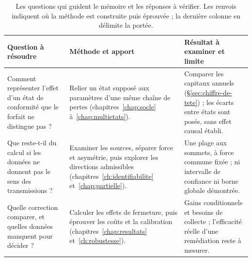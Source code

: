 \begin{table}[H]\centering\small
\begingroup
{}
\renewcommand{\arraystretch}{1.3}
\begin{tabularx}{\textwidth}{@{}*{3}{>{\raggedright\arraybackslash}X}@{}}
\toprule
\textbf{Question à résoudre} & \textcolor{reperecritique}{\textbf{Méthode et apport}} & \textcolor{reperereponse}{\textbf{Résultat à examiner et limite}} \\
\midrule
Comment représenter l'effet d'un état de conformité que le forfait ne distingue pas ?
& Relier un état supposé aux paramètres d'une même chaîne de pertes (chapitres~\ref{chap:socle} à~\ref{chap:multietats}).
& Comparer les capitaux annuels (\S\ref{sec:chiffre-de-tete}) ; les écarts entre états sont posés, sans effet causal établi. \\
\addlinespace
Que reste-t-il du calcul si les données ne donnent pas le sens des transmissions ?
& Examiner les sources, séparer force et asymétrie, puis explorer les directions admissibles (chapitres~\ref{ch:identifiabilite} et~\ref{chap:partielle}).
& Une plage aux sommets, à force commune fixée ; ni intervalle de confiance ni borne globale démontrée. \\
\addlinespace
Quelle correction comparer, et quelles données manquent pour décider ?
& Calculer les effets de fermeture, puis éprouver les coûts et la calibration (chapitres~\ref{chap:resultats} et~\ref{ch:robustesse}).
& Gains conditionnels et besoins de collecte ; l'efficacité réelle d'une remédiation reste à mesurer. \\
\bottomrule
\end{tabularx}
\endgroup
\caption{Les questions qui guident le mémoire et les réponses à vérifier. Les renvois indiquent
où la méthode est construite puis éprouvée ; la dernière colonne en délimite la portée.}
\label{tab:apports-institut}
\end{table}
